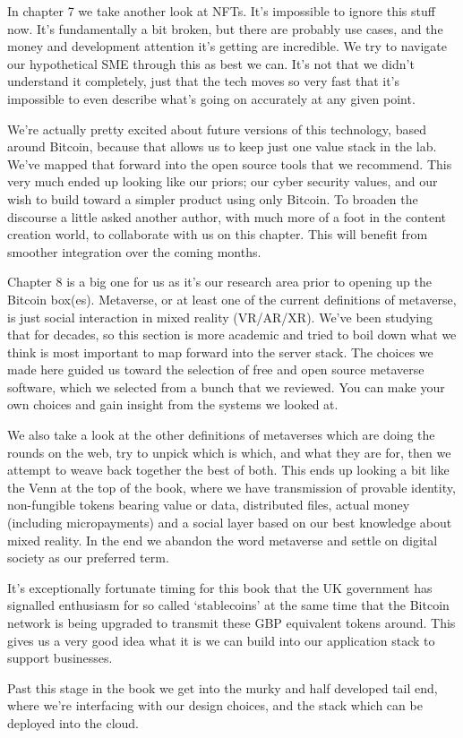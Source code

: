 In chapter 7 we take another look at NFTs. It’s impossible to ignore this stuff now. It’s fundamentally a bit broken, but there are probably use cases, and the money and development attention it’s getting are incredible. We try to navigate our hypothetical SME through this as best we can. It’s not that we didn’t understand it completely, just that the tech moves so very fast that it’s impossible to even describe what’s going on accurately at any given point. \par
We’re actually pretty excited about future versions of this technology, based around Bitcoin, because that allows us to keep just one value stack in the lab. We’ve mapped that forward into the open source tools that we recommend. This very much ended up looking like our priors; our cyber security values, and our wish to build toward a simpler product using only Bitcoin. To broaden the discourse a little asked another author, with much more of a foot in the content creation world, to collaborate with us on this chapter. This will benefit from smoother integration over the coming months.\par
Chapter 8 is a big one for us as it’s our research area prior to opening up the Bitcoin box(es). Metaverse, or at least one of the current definitions of metaverse, is just social interaction in mixed reality (VR/AR/XR). We’ve been studying that for decades, so this section is more academic and tried to boil down what we think is most important to map forward into the server stack. The choices we made here guided us toward the selection of free and open source metaverse software, which we selected from a bunch that we reviewed. You can make your own choices and gain insight from the systems we looked at.\par
We also take a look at the other definitions of metaverses which are doing the rounds on the web, try to unpick which is which, and what they are for, then we attempt to weave back together the best of both. This ends up looking a bit like the Venn at the top of the book, where we have transmission of provable identity, non-fungible tokens bearing value or data, distributed files, actual money (including micropayments) and a social layer based on our best knowledge about mixed reality. In the end we abandon the word metaverse and settle on digital society as our preferred term.\par
It's exceptionally fortunate timing for this book that the UK government has signalled enthusiasm for so called `stablecoins' at the same time that the Bitcoin network is being upgraded to transmit these GBP equivalent tokens around. This gives us a very good idea what it is we can build into our application stack to support businesses.\par 
Past this stage in the book we get into the murky and half developed tail end, where we’re interfacing with our design choices, and the stack which can be deployed into the cloud.


